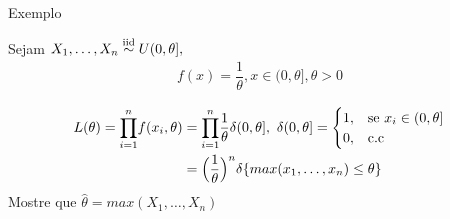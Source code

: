 \documentclass[12pt]{beamer}
\begin{document}
\begin{frame}{Exemplo}
\vspace{-0.3cm}
\begin{block}{}
\justifying
Sejam $X_{1},\ldots,X_{n}\overset{\text{iid}}{\sim} U(0,\theta],$ 
\begin{align*}
    f(x)=\dfrac{1}{\theta},x\in(0,\theta],\theta>0
\end{align*}
\end{block}
\pause
\begin{block}{\Home}
\justifying
\begin{align*}
L(\theta)={\displaystyle \prod_{i=1}^{n}} f(x_{i},\theta)&={\displaystyle \prod_{i=1}^{n}}\dfrac{1}{\theta}\delta(0,\theta],~\delta(0,\theta]=\begin{cases}
			1, & \text{se $x_{i}\in(0,\theta]$}\\
            0, & \text{c.c}
		 \end{cases}\\
   &=\Big(\dfrac{1}{\theta}\Big)^{n}\delta\{max(x_{1},\ldots,x_{n})\leq \theta\}
\end{align*}
Mostre que $\hat{\theta}=max(X_{1},\ldots,X_{n})$
\end{block}
\end{frame}

\end{document}
